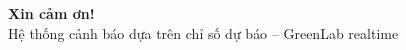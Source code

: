 



\begin{frame}
  \titlepage
\end{frame}





\begin{frame}[plain]
  \centering
  {\Huge \textbf{Xin cảm ơn!}}\\[1em]
  \large Hệ thống cảnh báo dựa trên chỉ số dự báo -- GreenLab realtime
\end{frame}


